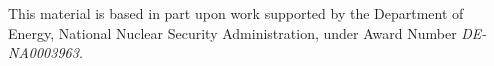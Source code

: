\begin{frame}\frametitle{}

\vspace*{0.2in}

\begin{center}

\vspace*{0.35in}
\newline
\newline
\vspace{5mm}
\begin{minipage}{0.8\textwidth}
This material is based in part upon work supported by the Department of Energy, National Nuclear Security Administration, under Award Number \textit{DE-NA0003963}.
\end{minipage}
\end{center}
\end{frame}


